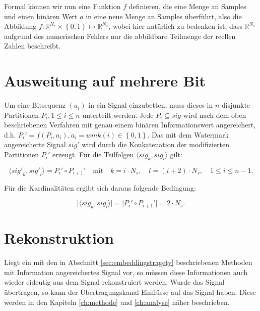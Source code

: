 Formal können wir nun eine Funktion $f$ definieren, die eine Menge an Samples und einen binären Wert $a$ in eine neue Menge an Samples überführt, also die Abbildung $f: {\mathbb{R}}^{{N}_{s}} \times \left\{0,1\right\} \mapsto  {\mathbb{R}}^{{N}_{s}}$, wobei hier natürlich zu bedenken ist, dass ${\mathbb{R}}^{{N}_{s}}$ aufgrund des numerischen Fehlers nur die abbildbare Teilmenge der reellen Zahlen beschreibt. 

\section{Ausweitung auf mehrere Bit}
\label{sec:embeddingstragety_bitsequence}

Um eine Bitsequenz $({a}_{i})$ in ein Signal einzubetten, muss dieses in $n$ disjunkte Partitionen ${P}_{i}, {1}\leq{i}\leq{n}$ unterteilt werden. Jede ${P}_{i}\subseteq{sig}$ wird nach dem oben beschriebenen Verfahren mit genau einem binären Informationswert angereichert, d.h. ${P}_{i}'=f({P}_{i}, {a}_{i}), {a}_{i} = wmk(i)\in\left\{0,1\right\}$. Das mit dem Watermark angereicherte Signal $sig'$ wird durch die Konkatenation der modifizierten Partitionen ${P}_{i}'$ erzeugt. Für die Teilfolgen $\langle{sig}_{k},{sig}_{l}\rangle$ gilt:

	\begin{equation}
		\langle{sig'}_{k},{sig'}_{l}\rangle = {P}_{i}'\circ{P}_{i+1}' \quad\mbox{mit}\quad k=i \cdot {N}_{s},\quad l=(i+2) \cdot {N}_{s},\quad {1}\leq{i}\leq{n-1}.
		\label{equ:signalconcat}
	\end{equation}

Für die Kardinalitäten ergibt sich daraus folgende Bedingung:

	\begin{equation}
 	   \vert\langle{sig}_{k},{sig}_{l}\rangle\vert = \vert{P}_{i}'\circ{P}_{i+1}'\vert = 2 \cdot {N}_{s}.
	   \label{equ:signalcardinality}
	\end{equation}

\section{Rekonstruktion}
\label{sec:reconstruction}

Liegt ein mit den in Abschnitt \ref{sec:embeddingstragety} beschriebenen Methoden mit Information angereichertes Signal vor, so müssen diese Informationen auch wieder eideutig aus dem Signal rekonstruiert werden. Wurde das Signal übertragen, so kann der Übertragungskanal Einflüsse auf das Signal haben. Diese werden in den Kapiteln \ref{ch:methode} und \ref{ch:analyse} näher beschrieben. 


